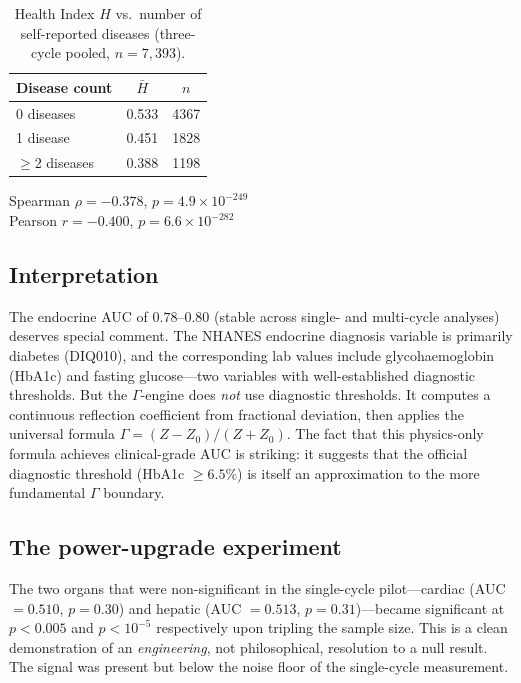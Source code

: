 \documentclass[aps,pre,twocolumn,superscriptaddress,floatfix]{revtex4-2}
\begin{document}
\begin{table}[h]
\centering
\caption{Health Index $H$ vs.\ number of self-reported
diseases (three-cycle pooled, $n=7{,}393$).}
\label{tab:health-index}
\begin{tabular}{lcc}
\toprule
Disease count & $\bar{H}$ & $n$ \\
\midrule
0 diseases   & 0.533 & 4367 \\
1 disease    & 0.451 & 1828 \\
$\geq$2 diseases & 0.388 & 1198 \\
\bottomrule
\end{tabular}
\medskip

Spearman $\rho = -0.378$, $p = 4.9\times10^{-249}$\\
Pearson $r = -0.400$, $p = 6.6\times10^{-282}$
\end{table}

\subsection{Interpretation}

The endocrine AUC of $0.78$--$0.80$ (stable across single-
and multi-cycle analyses) deserves special comment.
The NHANES endocrine diagnosis variable is primarily
diabetes (DIQ010), and the corresponding lab values
include glycohaemoglobin (HbA1c) and fasting glucose---two
variables with well-established diagnostic thresholds.
But the $\Gamma$-engine does \emph{not} use diagnostic
thresholds.  It computes a continuous reflection coefficient
from fractional deviation, then applies the universal
formula $\Gamma=(Z-Z_0)/(Z+Z_0)$.
The fact that this physics-only formula achieves clinical-grade
AUC is striking: it suggests that the official diagnostic
threshold (HbA1c $\geq 6.5\%$) is itself an approximation
to the more fundamental $\Gamma$ boundary.

\subsection{The power-upgrade experiment}

The two organs that were non-significant in the single-cycle
pilot---cardiac (AUC $= 0.510$, $p = 0.30$) and
hepatic (AUC $= 0.513$, $p = 0.31$)---became significant
at $p < 0.005$ and $p < 10^{-5}$ respectively upon tripling
the sample size.  This is a clean demonstration of an
\emph{engineering}, not philosophical, resolution to a null
result.  The signal was present but below the noise floor
of the single-cycle measurement.
\end{document}
